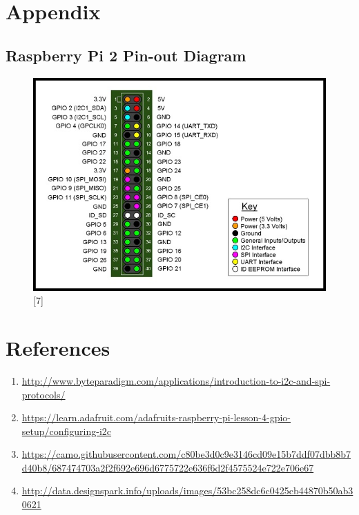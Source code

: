 \documentclass[11pt,a4paper]{article}
\begin{document}
	\newpage

	\section{Appendix}
	\subsection{Raspberry Pi 2 Pin-out Diagram}
	\begin{figure}[h!]
		\includegraphics[scale=0.6]{RaspberryPi2_pinout.jpg}
		\centering
		\caption{[7]}
	\end{figure}
	
    \section{References}
    \begin{enumerate}
    	\item \url{http://www.byteparadigm.com/applications/introduction-to-i2c-and-spi-protocols/}
    	\item \url{https://learn.adafruit.com/adafruits-raspberry-pi-lesson-4-gpio-setup/configuring-i2c}
    	\item \url{https://camo.githubusercontent.com/c80be3d0c9e3146cd09e15b7ddf07dbb8b7d40b8/687474703a2f2f692e696d6775722e636f6d2f4575524e722e706e67}
    	\item \url{http://data.designspark.info/uploads/images/53bc258dc6c0425cb44870b50ab30621}
    \end{enumerate}
    
\end{document}
